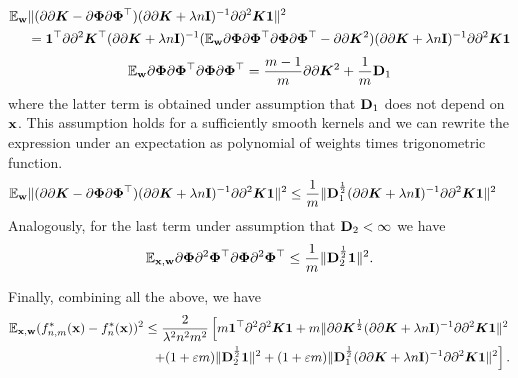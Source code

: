 \begin{align*}
    \mathbb{E}_{\bf w}&\|(\partial\partial {\bm K} - \partial\bm{\Phi}\partial\bm{\Phi}^{\top})(\partial\partial {\bm K} + \lambda n {\bf I})^{-1}\partial\partial^2 {\bm K}{\bf 1}\|^2\\
    & = {\bf 1}^{\top}\partial\partial^2 {\bm K}^{\top}(\partial\partial {\bm K} + \lambda n {\bf I})^{-1}(\mathbb{E}_{\bf w}\partial\bm{\Phi}\partial\bm{\Phi}^{\top}\partial\bm{\Phi}\partial\bm{\Phi}^{\top} - \partial\partial {\bm K}^2)(\partial\partial {\bm K} + \lambda n {\bf I})^{-1}\partial\partial^2 {\bm K}{\bf 1}
\end{align*}
\begin{align*}
    \mathbb{E}_{\bf w}\partial\bm{\Phi}\partial\bm{\Phi}^{\top}\partial\bm{\Phi}\partial\bm{\Phi}^{\top} = \frac{m - 1}{m} \partial\partial {\bm K}^2 + \frac{1}{m}{\bf D}_1
\end{align*}
where the latter term is obtained under assumption that ${\bf D}_1$ does not depend on
${\bf x}$.
This assumption holds for a sufficiently smooth kernels and we can
rewrite the expression under an expectation as polynomial of weights times
trigonometric function.
\begin{align*}
    \mathbb{E}_{\bf w}&\|(\partial\partial {\bm K} - \partial\bm{\Phi}\partial\bm{\Phi}^{\top})(\partial\partial {\bm K} + \lambda n {\bf I})^{-1}\partial\partial^2 {\bm K}{\bf 1}\|^2
    \leq \frac{1}{m}\|{\bf D}_1^{\frac{1}{2}}(\partial\partial {\bm K} + \lambda n {\bf I})^{-1}\partial\partial^2 {\bm K}{\bf 1}\|^2
\end{align*}
Analogously, for the last term under assumption that ${\bf D}_2 < \infty$ we have
\begin{align*}
    \mathbb{E}_{{\bf x, w}} \partial\bm{\Phi}\partial^2\bm{\Phi}^{\top}\partial\bm{\Phi}\partial^2\bm{\Phi}^{\top} \leq \frac{1}{m}\|{\bf D}_2^{\frac{1}{2}}{\bf 1}\|^2.
\end{align*}

Finally, combining all the above, we have
\begin{align*}
    \mathbb{E}_{{\bf x}, {\bf w}}(f_{n, m}^*({\bf x}) - f_n^*({\bf x}))^2 \leq \frac{2}{\lambda^2 n^2 m^2}\left[
    m{\bf 1}^{\top}\partial^2\partial^2{\bm K}{\bf 1} + m\|\partial\partial {\bm K}^{\frac{1}{2}}(\partial\partial {\bm K} + \lambda n{\bf I})^{-1}\partial\partial^2 {\bm K}{\bf 1}\|^2 \right. \nonumber \\
    \left. + (1 + \varepsilon m)\|{\bf D}_2^{\frac{1}{2}}{\bf 1}\|^2 + (1 + \varepsilon m)\|{\bf D}_1^{\frac{1}{2}}(\partial\partial {\bm K} + \lambda n {\bf I})^{-1}\partial\partial^2 {\bm K}{\bf 1}\|^2
    \right].
\end{align*}



